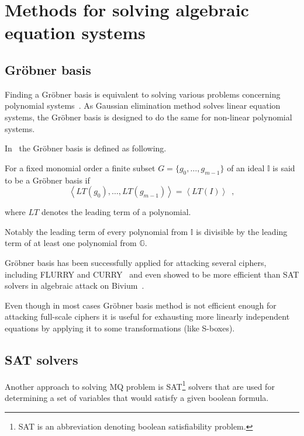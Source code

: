 \section{Methods for solving algebraic equation systems}

\subsection{Gr\"obner basis}
\label{sec:groebner}

Finding a Gr\"obner basis is equivalent to solving various problems concerning
polynomial systems~\cite{bard2009algebraic}. As Gaussian elimination method
solves linear equation systems, the Gr\"obner basis is designed to do the same
for non-linear polynomial systems.

In~\cite{Albrecht2006} the Gr\"obner basis is defined as following.

For a fixed monomial order a finite subset $G = \{g_0, \hdots, g_{m-1}\}$
of an ideal $\mathbb{I}$ is said to be a Gr\"obner basis if
\begin{equation}
    \label{eqn:groebner}
    \left< LT(g_0), \hdots, LT(g_{m-1}) \right> = \left< LT(I) \right> \enspace,
\end{equation}

where $LT$ denotes the leading term of a polynomial.

Notably the leading term of every polynomial from $\mathbb{I}$ is divisible by
the leading term of at least one polynomial from $\mathbb{G}$.

Gr\"obner basis has been successfully applied for attacking several ciphers,
including FLURRY and CURRY~\cite{Pyshkin2008:groebner} and even showed to be
more efficient than SAT solvers in algebraic attack on
Bivium~\cite{springerlink:10.1007/s11786-009-0016-7}.

Even though in most cases Gr\"obner basis method is not efficient enough for
attacking full-scale ciphers it is useful for exhausting more linearly 
independent equations by applying it to some transformations (like S-boxes).

\subsection{SAT solvers}

Another approach to solving MQ problem is SAT\footnote{SAT is an abbreviation
denoting boolean satisfiability problem.} solvers that are used for
determining a set of variables that would satisfy a given boolean formula. 

